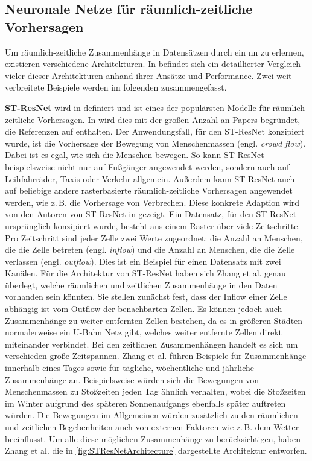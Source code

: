 \subsection{Neuronale Netze für räumlich-zeitliche Vorhersagen}
\label{sec:STNNs}

Um räumlich-zeitliche Zusammenhänge in Datensätzen durch ein \acrshort{nn} zu erlernen, existieren verschiedene Architekturen.
In \cite{DLTraff} befindet sich ein detaillierter Vergleich vieler dieser Architekturen anhand ihrer Ansätze und Performance.
Zwei weit verbreitete Beispiele werden im folgenden zusammengefasst.

\textbf{ST-ResNet} wird in \cite{STResNetOriginal} definiert und ist eines der populärsten Modelle für räumlich-zeitliche Vorhersagen.
In \cite{DLTraff} wird dies mit der großen Anzahl an Papers begründet, die Referenzen auf \cite{STResNetOriginal} enthalten.
Der Anwendungsfall, für den ST-ResNet konzipiert wurde, ist die Vorhersage der Bewegung von Menschenmassen (engl. \emph{crowd flow}).
Dabei ist es egal, wie sich die Menschen bewegen.
So kann ST-ResNet beispielsweise nicht nur auf Fußgänger angewendet werden, sondern auch auf Leihfahrräder, Taxis oder Verkehr allgemein.
Außerdem kann ST-ResNet auch auf beliebige andere rasterbasierte räumlich-zeitliche Vorhersagen angewendet werden, wie z.\,B. die Vorhersage von Verbrechen.
Diese konkrete Adaption wird von den Autoren von ST-ResNet in \cite{CrimeSTResNet} gezeigt.
Ein Datensatz, für den ST-ResNet ursprünglich konzipiert wurde, besteht aus einem Raster über viele Zeitschritte.
Pro Zeitschritt sind jeder Zelle zwei Werte zugeordnet: die Anzahl an Menschen, die die Zelle betreten (engl. \emph{inflow}) und die Anzahl an Menschen, die die Zelle verlassen (engl. \emph{outflow}).
Dies ist ein Beispiel für einen Datensatz mit zwei Kanälen.
Für die Architektur von ST-ResNet haben sich Zhang et al. genau überlegt, welche räumlichen und zeitlichen Zusammenhänge in den Daten vorhanden sein könnten.
Sie stellen zunächst fest, dass der Inflow einer Zelle abhängig ist vom Outflow der benachbarten Zellen.
Es können jedoch auch Zusammenhänge zu weiter entfernten Zellen bestehen, da es in größeren Städten normalerweise ein U-Bahn Netz gibt, welches weiter entfernte Zellen direkt miteinander verbindet.
Bei den zeitlichen Zusammenhängen handelt es sich um verschieden große Zeitspannen.
Zhang et al. führen Beispiele für Zusammenhänge innerhalb eines Tages sowie für tägliche, wöchentliche und jährliche Zusammenhänge an.
Beispielsweise würden sich die Bewegungen von Menschenmassen zu Stoßzeiten jeden Tag ähnlich verhalten, wobei die Stoßzeiten im Winter aufgrund des späteren Sonnenaufgangs ebenfalls später auftreten würden.
Die Bewegungen im Allgemeinen würden zusätzlich zu den räumlichen und zeitlichen Begebenheiten auch von externen Faktoren wie z.\,B. dem Wetter beeinflusst.
Um alle diese möglichen Zusammenhänge zu berücksichtigen, haben Zhang et al. die in \autoref{fig:STResNetArchitecture} dargestellte Architektur entworfen.

